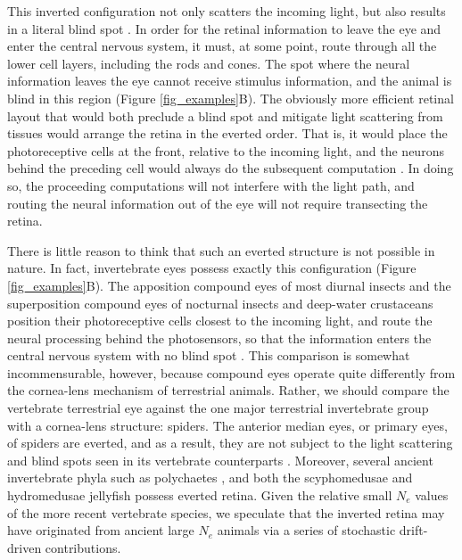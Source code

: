 \documentclass[twocolumn]{article}
\begin{document}
This inverted configuration not only scatters the incoming light, but also results in a literal blind spot \cite{land_nilsson_2012}. In order for the retinal information to leave the eye and enter the central nervous system, it must, at some point, route through all the lower cell layers, including the rods and cones. The spot where the neural information leaves the eye cannot receive stimulus information, and the animal is blind in this region (Figure \ref{fig_examples}B). The obviously more efficient retinal layout that would both preclude a blind spot and mitigate light scattering from tissues would arrange the retina in the everted order. That is, it would place the photoreceptive cells at the front, relative to the incoming light, and the neurons behind the preceding cell would always do the subsequent computation \cite{land_nilsson_2012}. In doing so, the proceeding computations will not interfere with the light path, and routing the neural information out of the eye will not require transecting the retina. 

There is little reason to think that such an everted structure is not possible in nature. In fact, invertebrate eyes possess exactly this configuration (Figure \ref{fig_examples}B). The apposition compound eyes of most diurnal insects and the superposition compound eyes of nocturnal insects and deep-water crustaceans position their photoreceptive cells closest to the incoming light, and route the neural processing behind the photosensors, so that the information enters the central nervous system with no blind spot \cite{land_nilsson_2012}. This comparison is somewhat incommensurable, however, because compound eyes operate quite differently from the cornea-lens mechanism of terrestrial animals. Rather, we should compare the vertebrate terrestrial eye against the one major terrestrial invertebrate group with a cornea-lens structure: spiders. The anterior median eyes, or primary eyes, of spiders are everted, and as a result, they are not subject to the light scattering and blind spots seen in its vertebrate counterparts \cite{land_nilsson_2012, norgaard_2008}. Moreover, several ancient invertebrate phyla such as polychaetes \cite{richter_2010}, and both the scyphomedusae and hydromedusae jellyfish \cite{garm_2010} possess everted retina. Given the relative small $N_e$ values of the more recent vertebrate species, we speculate that the inverted retina may have originated from ancient large $N_e$ animals via a series of stochastic drift-driven contributions.
\end{document}
